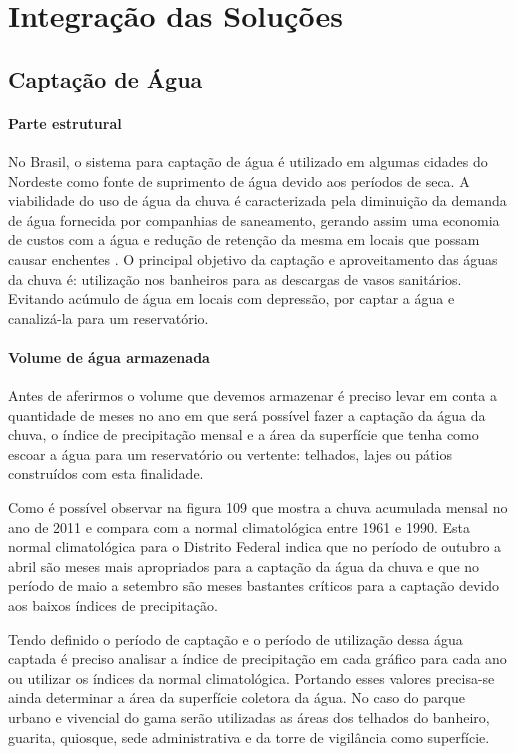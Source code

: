 \part{Integração das Soluções}

\chapter{Captação de Água}

\subsection{Parte estrutural}

No Brasil, o sistema para captação de água é utilizado em algumas cidades do Nordeste como fonte de suprimento de água devido aos períodos de seca. A viabilidade do uso de água da chuva é caracterizada pela diminuição da demanda de água fornecida por companhias de saneamento, gerando assim uma economia de custos com a água e redução de retenção da mesma em locais que possam causar enchentes \citep{MAY}.
O principal objetivo da captação e aproveitamento das águas da chuva é: utilização nos banheiros para as descargas de vasos sanitários. Evitando acúmulo de água em locais com depressão, por captar a água e canalizá-la para um reservatório.

\subsection{Volume de água armazenada}

Antes de aferirmos o volume que devemos armazenar é preciso levar em conta a quantidade de meses no ano em que será possível fazer a captação da água da chuva, o índice de precipitação mensal e a área da superfície que tenha como escoar a água para um reservatório ou vertente: telhados, lajes ou pátios construídos com esta finalidade. 

Como é possível observar na figura 109 que mostra a chuva acumulada mensal no ano de 2011 e compara com a normal climatológica entre 1961 e 1990. Esta normal climatológica para o Distrito Federal indica que no período de outubro a abril são meses mais apropriados para a captação da água da chuva e que no período de maio a setembro são meses bastantes críticos para a captação devido aos baixos índices de precipitação. 

Tendo definido o período de captação e o período de utilização dessa água captada é preciso analisar a índice de precipitação em cada gráfico para cada ano ou utilizar os índices da normal climatológica. Portando esses valores precisa-se ainda determinar a área da superfície coletora da água. No caso do parque urbano e vivencial do gama serão utilizadas as áreas dos telhados do banheiro, guarita, quiosque, sede administrativa e da torre de vigilância como superfície. 

